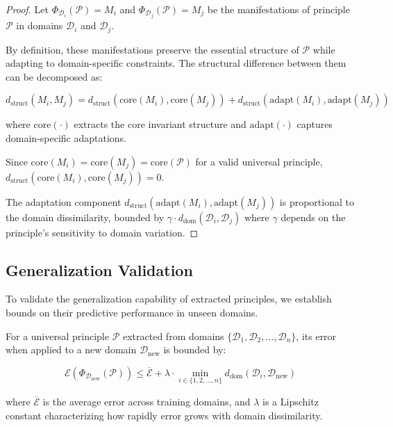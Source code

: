 \begin{proof}
Let $\Phi_{\mathcal{D}_i}(\mathcal{P}) = M_i$ and $\Phi_{\mathcal{D}_j}(\mathcal{P}) = M_j$ be the manifestations of principle $\mathcal{P}$ in domains $\mathcal{D}_i$ and $\mathcal{D}_j$.

By definition, these manifestations preserve the essential structure of $\mathcal{P}$ while adapting to domain-specific constraints. The structural difference between them can be decomposed as:

\begin{equation}
d_{\text{struct}}(M_i, M_j) = d_{\text{struct}}(\text{core}(M_i), \text{core}(M_j)) + d_{\text{struct}}(\text{adapt}(M_i), \text{adapt}(M_j))
\end{equation}

where $\text{core}(\cdot)$ extracts the core invariant structure and $\text{adapt}(\cdot)$ captures domain-specific adaptations.

Since $\text{core}(M_i) = \text{core}(M_j) = \text{core}(\mathcal{P})$ for a valid universal principle, $d_{\text{struct}}(\text{core}(M_i), \text{core}(M_j)) = 0$.

The adaptation component $d_{\text{struct}}(\text{adapt}(M_i), \text{adapt}(M_j))$ is proportional to the domain dissimilarity, bounded by $\gamma \cdot d_{\text{dom}}(\mathcal{D}_i, \mathcal{D}_j)$ where $\gamma$ depends on the principle's sensitivity to domain variation.
\end{proof}

\subsection{Generalization Validation}

To validate the generalization capability of extracted principles, we establish bounds on their predictive performance in unseen domains.

\begin{theorem}
For a universal principle $\mathcal{P}$ extracted from domains $\{\mathcal{D}_1, \mathcal{D}_2, \ldots, \mathcal{D}_n\}$, its error when applied to a new domain $\mathcal{D}_{\text{new}}$ is bounded by:

\begin{equation}
\mathcal{E}(\Phi_{\mathcal{D}_{\text{new}}}(\mathcal{P})) \leq \overline{\mathcal{E}} + \lambda \cdot \min_{i \in \{1,2,\ldots,n\}} d_{\text{dom}}(\mathcal{D}_i, \mathcal{D}_{\text{new}})
\end{equation}

where $\overline{\mathcal{E}}$ is the average error across training domains, and $\lambda$ is a Lipschitz constant characterizing how rapidly error grows with domain dissimilarity.
\end{theorem}

